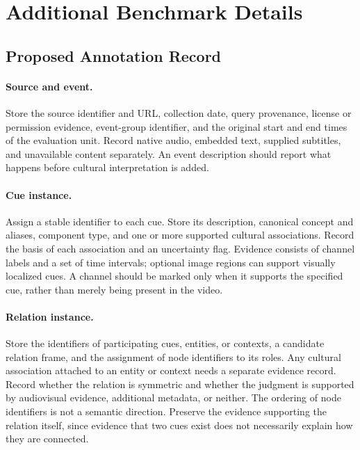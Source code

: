 \section{Additional Benchmark Details}
\label{sec:appendix-benchmark}

\subsection{Proposed Annotation Record}
\label{sec:annotation-record}

\paragraph{Source and event.}
Store the source identifier and URL, collection date, query provenance,
license or permission evidence, event-group identifier, and the original
start and end times of the evaluation unit. Record native audio,
embedded text, supplied subtitles, and unavailable content separately.
An event description should report what happens before cultural
interpretation is added.

\paragraph{Cue instance.}
Assign a stable identifier to each cue. Store its description, canonical
concept and aliases, component type, and one or more supported cultural
associations. Record the basis of each association and an uncertainty
flag. Evidence consists of channel labels and a set of time intervals;
optional image regions can support visually localized cues. A channel
should be marked only when it supports the specified cue, rather than
merely being present in the video.

\paragraph{Relation instance.}
Store the identifiers of participating cues, entities, or contexts, a
candidate relation frame, and the assignment of node identifiers to its roles.
Any cultural association attached to an entity or context needs a separate
evidence record. 
Record whether the relation is symmetric and whether the judgment is
supported by audiovisual evidence, additional metadata, or neither.
The ordering of node identifiers is not a semantic direction. Preserve
the evidence supporting the relation itself, since evidence that two
cues exist does not necessarily explain how they are connected.

